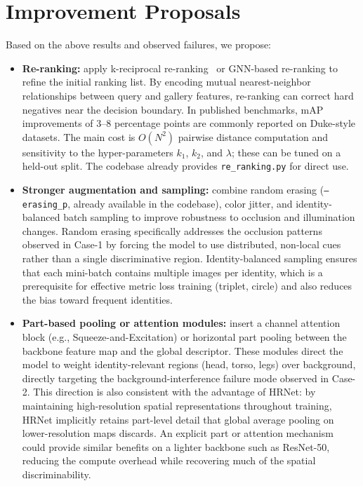 \documentclass[sigconf,nonacm]{acmart}
\begin{document}
\section{Improvement Proposals}
Based on the above results and observed failures, we propose:
\begin{itemize}
  \item \textbf{Re-ranking:} apply k-reciprocal re-ranking~\cite{zhong2017re} or GNN-based re-ranking to refine the initial ranking list.
  By encoding mutual nearest-neighbor relationships between query and gallery features, re-ranking can correct hard negatives near the decision boundary.
  In published benchmarks, mAP improvements of $3$--$8$ percentage points are commonly reported on Duke-style datasets.
  The main cost is $O(N^2)$ pairwise distance computation and sensitivity to the hyper-parameters $k_1$, $k_2$, and $\lambda$; these can be tuned on a held-out split.
  The codebase already provides \texttt{re\_ranking.py} for direct use.
  \item \textbf{Stronger augmentation and sampling:} combine random erasing (\texttt{--erasing\_p}, already available in the codebase), color jitter, and identity-balanced batch sampling to improve robustness to occlusion and illumination changes.
  Random erasing specifically addresses the occlusion patterns observed in Case-1 by forcing the model to use distributed, non-local cues rather than a single discriminative region.
  Identity-balanced sampling ensures that each mini-batch contains multiple images per identity, which is a prerequisite for effective metric loss training (triplet, circle) and also reduces the bias toward frequent identities.
  \item \textbf{Part-based pooling or attention modules:} insert a channel attention block (e.g., Squeeze-and-Excitation) or horizontal part pooling between the backbone feature map and the global descriptor.
  These modules direct the model to weight identity-relevant regions (head, torso, legs) over background, directly targeting the background-interference failure mode observed in Case-2.
  This direction is also consistent with the advantage of HRNet: by maintaining high-resolution spatial representations throughout training, HRNet implicitly retains part-level detail that global average pooling on lower-resolution maps discards.
  An explicit part or attention mechanism could provide similar benefits on a lighter backbone such as ResNet-50, reducing the compute overhead while recovering much of the spatial discriminability.
\end{itemize}
\end{document}
